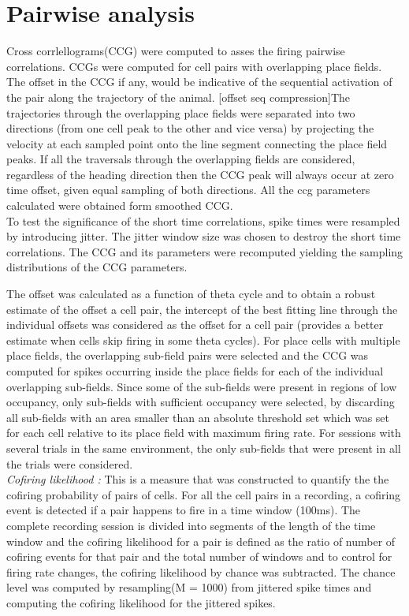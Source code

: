 \section{Pairwise analysis}
Cross corrlellograms(CCG) were computed to asses the firing pairwise correlations. CCGs were computed for cell pairs with overlapping place fields. The offset in the CCG if any, would be indicative of the sequential activation of the pair along the trajectory of the animal. [offset seq compression]The trajectories through the overlapping place fields were separated into two directions (from one cell peak to the other and vice versa) by projecting the velocity at each sampled point onto the line segment connecting the place field peaks. If all the traversals through the overlapping fields are considered, regardless of the heading direction then the CCG peak will always occur at zero time offset, given equal sampling of both directions. All the ccg parameters calculated were obtained form smoothed CCG. \\
To test the significance of the short time correlations, spike times were resampled by introducing jitter. The jitter window size was chosen to destroy the short time correlations. The CCG and its parameters were recomputed yielding the sampling distributions of the CCG parameters.

The offset was calculated as a function of theta cycle and to obtain a robust estimate of the offset a cell pair, the intercept of the best fitting line through the individual offsets was considered as the offset for a cell pair (provides a better estimate when cells skip firing in some theta cycles). For place cells with multiple place fields, the overlapping sub-field pairs were selected and the CCG was computed for spikes occurring inside the place fields for each of the individual overlapping sub-fields. Since some of the sub-fields were present in regions of low occupancy, only sub-fields with sufficient occupancy were selected, by discarding all sub-fields with an area smaller than an absolute threshold set which was set for each cell relative to its place field with maximum firing rate. For sessions with several trials in the same environment, the only sub-fields that were present in all the trials were considered. \\ %

\emph{Cofiring likelihood : } This is a measure that was constructed to quantify the the cofiring probability of pairs of cells. For all the cell pairs in a recording, a cofiring event is detected if a pair happens to fire in a time window (100ms). The complete recording session is divided into segments of the length of the time window and the cofiring likelihood for a pair is defined as the ratio of number of cofiring events for that pair and the total number of windows and to control for firing rate changes, the cofiring likelihood by chance was subtracted. The chance level was computed by resampling(M = 1000) from jittered spike times and computing the cofiring likelihood for the jittered spikes.

